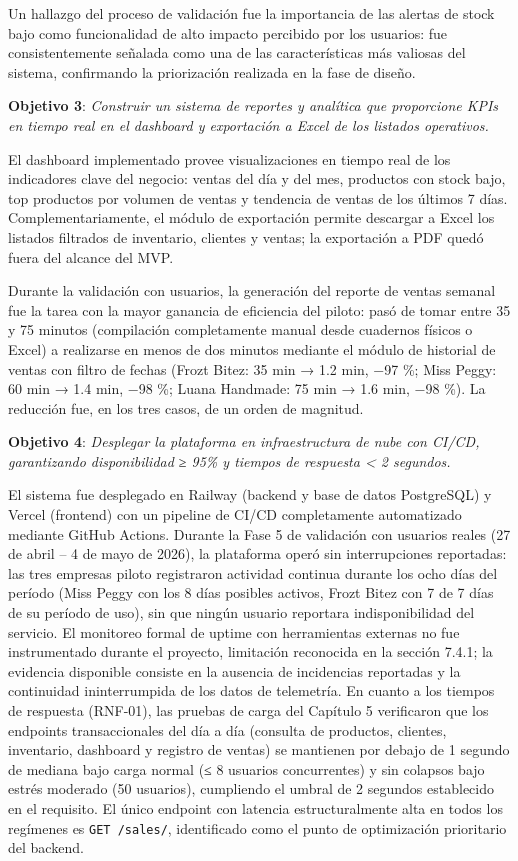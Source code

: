 Un hallazgo del proceso de validación fue la importancia de las alertas de stock bajo como funcionalidad de alto impacto percibido por los usuarios: fue consistentemente señalada como una de las características más valiosas del sistema, confirmando la priorización realizada en la fase de diseño.

\textbf{Objetivo 3}: \emph{Construir un sistema de reportes y analítica que proporcione KPIs en tiempo real en el dashboard y exportación a Excel de los listados operativos.}

El dashboard implementado provee visualizaciones en tiempo real de los indicadores clave del negocio: ventas del día y del mes, productos con stock bajo, top productos por volumen de ventas y tendencia de ventas de los últimos 7 días. Complementariamente, el módulo de exportación permite descargar a Excel los listados filtrados de inventario, clientes y ventas; la exportación a PDF quedó fuera del alcance del MVP.

Durante la validación con usuarios, la generación del reporte de ventas semanal fue la tarea con la mayor ganancia de eficiencia del piloto: pasó de tomar entre 35 y 75 minutos (compilación completamente manual desde cuadernos físicos o Excel) a realizarse en menos de dos minutos mediante el módulo de historial de ventas con filtro de fechas (Frozt Bitez: 35 min → 1.2 min, −97 \%; Miss Peggy: 60 min → 1.4 min, −98 \%; Luana Handmade: 75 min → 1.6 min, −98 \%). La reducción fue, en los tres casos, de un orden de magnitud.

\textbf{Objetivo 4}: \emph{Desplegar la plataforma en infraestructura de nube con CI/CD, garantizando disponibilidad ≥ 95\% y tiempos de respuesta \textless{} 2 segundos.}

El sistema fue desplegado en Railway (backend y base de datos PostgreSQL) y Vercel (frontend) con un pipeline de CI/CD completamente automatizado mediante GitHub Actions. Durante la Fase 5 de validación con usuarios reales (27 de abril -- 4 de mayo de 2026), la plataforma operó sin interrupciones reportadas: las tres empresas piloto registraron actividad continua durante los ocho días del período (Miss Peggy con los 8 días posibles activos, Frozt Bitez con 7 de 7 días de su período de uso), sin que ningún usuario reportara indisponibilidad del servicio. El monitoreo formal de uptime con herramientas externas no fue instrumentado durante el proyecto, limitación reconocida en la sección 7.4.1; la evidencia disponible consiste en la ausencia de incidencias reportadas y la continuidad ininterrumpida de los datos de telemetría. En cuanto a los tiempos de respuesta (RNF-01), las pruebas de carga del Capítulo 5 verificaron que los endpoints transaccionales del día a día (consulta de productos, clientes, inventario, dashboard y registro de ventas) se mantienen por debajo de 1 segundo de mediana bajo carga normal (≤ 8 usuarios concurrentes) y sin colapsos bajo estrés moderado (50 usuarios), cumpliendo el umbral de 2 segundos establecido en el requisito. El único endpoint con latencia estructuralmente alta en todos los regímenes es \texttt{GET\ /sales/}, identificado como el punto de optimización prioritario del backend.

